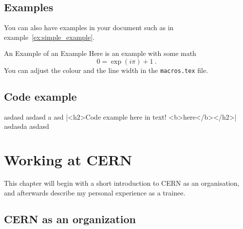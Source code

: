 



\section{Examples}
You can also have examples in your document such as in example~\ref{ex:simple_example}.
\begin{example}{An Example of an Example}
  \label{ex:simple_example}
  Here is an example with some math
  \begin{equation}
    0 = \exp(i\pi)+1\ .
  \end{equation}
  You can adjust the colour and the line width in the {\tt macros.tex} file.
\end{example}

\section{Code example}

asdasd asdasd  a asd 
|<h2>Code example here in text! <b>here</b></h2>|
asdasda 
asdasd



\chapter{Working at CERN}

This chapter will begin with a short introduction to CERN as an organisation, and afterwards describe my personal experience as a trainee.

\section{CERN as an organization}

